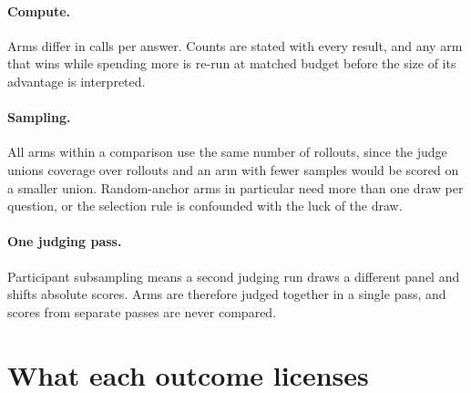 \documentclass[11pt]{article}
\theoremstyle{definition}
\begin{document}
\paragraph{Compute.} Arms differ in calls per answer. Counts are stated with
every result, and any arm that wins while spending more is re-run at matched
budget before the size of its advantage is interpreted.

\paragraph{Sampling.} All arms within a comparison use the same number of
rollouts, since the judge unions coverage over rollouts and an arm with fewer
samples would be scored on a smaller union. Random-anchor arms in particular
need more than one draw per question, or the selection rule is confounded with
the luck of the draw.

\paragraph{One judging pass.} Participant subsampling means a second judging run
draws a different panel and shifts absolute scores. Arms are therefore judged
together in a single pass, and scores from separate passes are never compared.

\section{What each outcome licenses}
\end{document}
